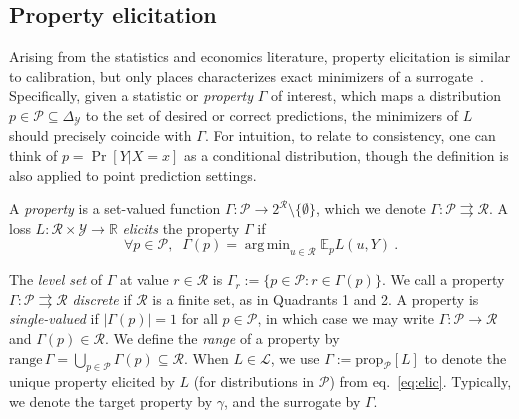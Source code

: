 \documentclass[anon,12pt]{colt2021} %
\newcommand{\reals}{\mathbb{R}}
\newcommand{\simplex}{\Delta_\Y}
\newcommand{\prop}[2][\mathcal{P}]{\mathrm{prop}_{#1}[#2]}
\newcommand{\range}{\mathrm{range}\,}
\newcommand{\E}{\mathbb{E}}
\renewcommand{\L}{\mathcal{L}}
\newcommand{\R}{\mathcal{R}}
\renewcommand{\P}{\mathcal{P}}
\newcommand{\Y}{\mathcal{Y}}
\newcommand{\exploss}[3]{\E_{#3} #1(#2,Y)}
\newcommand{\toto}{\rightrightarrows}
\DeclareMathOperator*{\argmin}{arg\,min}
\begin{document}






\subsection{Property elicitation}\label{subsec:properties}
Arising from the statistics and economics literature, property elicitation is similar to calibration, but only places characterizes exact minimizers of a surrogate~\citep{savage1971elicitation,osband1985information-eliciting,lambert2008eliciting,lambert2009eliciting,lambert2018elicitation,frongillo2015vector-valued,frongillo2014general}.
Specifically, given a statistic or \emph{property} $\Gamma$ of interest, which maps a distribution $p \in \P \subseteq \simplex$ to the set of desired or correct predictions, the minimizers of $L$ should precisely coincide with $\Gamma$.
For intuition, to relate to consistency, one can think of $p = \Pr[Y|X=x]$ as a conditional distribution, though the definition is also applied to point prediction settings.

\begin{definition}
	A \emph{property} is a set-valued function $\Gamma : \P \to 2^\R \setminus \{\emptyset\}$, which we denote $\Gamma: \P \toto \R$.
	A loss $L : \R \times \Y \to \reals$ \emph{elicits} the property $\Gamma$ if
	\begin{equation}
    \label{eq:elic}    
    \forall p \in \P, \;\; \Gamma(p) = \argmin_{u \in \R} \exploss{L}{u}{p}~.
	\end{equation}
\end{definition}

The \emph{level set} of $\Gamma$ at value $r\in\R$ is $\Gamma_r := \{p \in \P : r \in \Gamma(p)\}$.
We call a property $\Gamma: \P \toto \R$ \emph{discrete} if $\R$ is a finite set, as in Quadrants 1 and 2.
A property is \emph{single-valued} if $|\Gamma(p)|=1$ for all $p\in\P$, in which case we may write $\Gamma:\P\to\R$ and $\Gamma(p) \in \R$.
We define the \emph{range} of a property by $\range \Gamma = \bigcup_{p\in\P} \Gamma(p) \subseteq \R$.
When $L\in\L$, we use $\Gamma := \prop[\P]{L}$ to denote the unique property elicited by $L$ (for distributions in $\P$) from eq.~\eqref{eq:elic}. 
Typically, we denote the target property by $\gamma$, and the surrogate by $\Gamma$.
\end{document}
